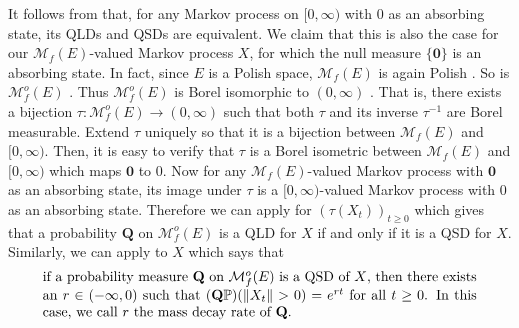 \documentclass[12pt,a4paper]{amsart}
\numberwithin{equation}{section}
\theoremstyle{plain}
\theoremstyle{definition}
\theoremstyle{remark}
\begin{document}
	It follows from \cite[Proposition 1]{MeleardVillemonais2012Quasi-stationary} that, for any Markov process on $[0,\infty)$ with $0$ as an absorbing state, its QLDs and QSDs are equivalent.
	We claim that this is also the case for our $\mathcal M_f(E)$-valued Markov process
	$X$, 
	for which the null measure $\{\mathbf 0\}$ is an absorbing state.
	In fact, since $E$ is a Polish space, $\mathcal M_f(E)$ is again Polish \cite[Lemma 4.3]{Kallenberg2017Random}.
	So is $\mathcal M^o_f(E)$ \cite[Theorem A1.2]{Kallenberg2002Foundations}.
	Thus $\mathcal M^o_f(E)$ is Borel isomorphic to $(0,\infty)$ \cite[Theorem A.1.6]{Kallenberg2002Foundations}.
	That is, there exists a bijection $\tau: \mathcal M^o_f(E) \to (0,\infty)$ such that both $\tau$ and its inverse $\tau^{-1}$ are Borel measurable.
	Extend $\tau$ uniquely so that it is a bijection between $\mathcal M_f(E)$ and $[0,\infty)$.
	Then, it is easy to verify that $\tau$ is a Borel isometric between $\mathcal M_f(E)$ and $[0,\infty)$ which maps $\mathbf 0$ to $0$. %
	Now for any $\mathcal M_f(E)$-valued Markov process with $\mathbf 0$ as an absorbing state, 
	its image under $\tau$ is a $[0,\infty)$-valued Markov process with $0$ as an absorbing state.
	Therefore we can apply \cite[Proposition 1]{MeleardVillemonais2012Quasi-stationary} for $(\tau(X_t))_{t\geq 0}$ which gives that
	a probability $\mathbf Q$ on $\mathcal M^o_f(E)$ is a QLD for $X$ if and only if it is a QSD for $X$.
	Similarly, we can apply \cite[Proposition 2]{MeleardVillemonais2012Quasi-stationary} to $X$ which says that
\begin{equation} \label{eq:S.2}
\begin{minipage}{0.9\textwidth}
	if a probability measure $\mathbf Q$ on $\mathcal M^o_f(E)$ is a QSD of $X$, then there exists an $r\in (-\infty,0)$ such that $(\mathbf Q\mathbb P)(\|X_t\|>0) = e^{rt}$ for all $t\geq 0$.
	In this case, we call $r$ the mass decay rate of $\mathbf Q$.
\end{minipage}
\end{equation}
	
\end{document}
